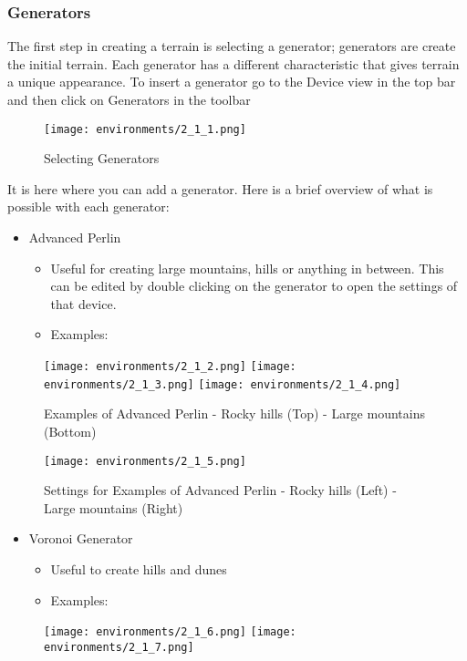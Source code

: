 \documentclass[../main.tex]{subfiles}
\begin{document}
\subsubsection{Generators}
The first step in creating a terrain is selecting a generator; generators are create the initial terrain. Each generator has a different characteristic that gives terrain a unique appearance. To insert a generator go to the Device view in the top bar and then click on Generators in the toolbar
\begin{figure}[H]
\texttt{[image: environments/2\_1\_1.png]}
\caption{Selecting Generators}
\end{figure}
It is here where you can add a generator.
Here is a brief overview of what is possible with each generator:
\begin{itemize}
    \item Advanced Perlin
    \begin{itemize}
        \item Useful for creating large mountains, hills or anything in between. This can be edited by double clicking on the generator to open the settings of that device.
        \item Examples:
    \end{itemize}
\end{itemize}
\begin{figure}[H]
\texttt{[image: environments/2\_1\_2.png]}
\texttt{[image: environments/2\_1\_3.png]}
\texttt{[image: environments/2\_1\_4.png]}
\caption{Examples of Advanced Perlin - Rocky hills (Top) - Large mountains (Bottom)}
\end{figure}
\begin{figure}[H]
\texttt{[image: environments/2\_1\_5.png]}
\caption{Settings for Examples of Advanced Perlin - Rocky hills (Left) - Large mountains (Right)}
\end{figure}
\begin{itemize}
    \item Voronoi Generator
    \begin{itemize}
        \item Useful to create hills and dunes
        \item Examples:
    \end{itemize}
\end{itemize}
\begin{figure}[H]
\texttt{[image: environments/2\_1\_6.png]}
\texttt{[image: environments/2\_1\_7.png]}
\end{figure}
\end{document}
